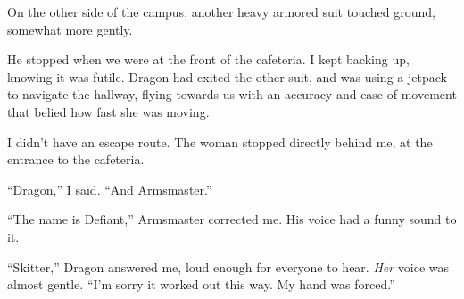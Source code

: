 On the other side of the campus, another heavy armored suit touched ground, somewhat more gently.



He stopped when we were at the front of the cafeteria.  I kept backing up, knowing it was futile.  Dragon had exited the other suit, and was using a jetpack to navigate the hallway, flying towards us with an accuracy and ease of movement that belied how fast she was moving.



I didn't have an escape route.  The woman stopped directly behind me, at the entrance to the cafeteria.



``Dragon,'' I said.  ``And Armsmaster.''



``The name is Defiant,'' Armsmaster corrected me.  His voice had a funny sound to it.



``Skitter,'' Dragon answered me, loud enough for everyone to hear.  \emph{Her} voice was almost gentle.  ``I'm sorry it worked out this way.  My hand was forced.''





